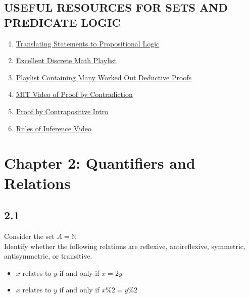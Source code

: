 \documentclass{article}
\begin{document}
\subsection*{USEFUL RESOURCES FOR SETS AND PREDICATE LOGIC}
\begin{enumerate}
    \item \href{https://www.youtube.com/watch?v=A2k3ulOJ3u4}{Translating Statements to Propositional Logic} 
    \item \href{https://www.youtube.com/watch?v=A3Ffwsnad0k&list=PLl-gb0E4MII28GykmtuBXNUNoej-vY5Rz}{Excellent Discrete Math Playlist}
    \item \href{https://www.youtube.com/watch?v=6o1kLNEE-d4&list=PLF_J2w5w0Z3E7jZGz-23P6WrKxokXBkHC}{Playlist Containing Many Worked Out Deductive Proofs}
    \item \href{https://www.youtube.com/watch?v=CpW0ZJ7i0oc}{MIT Video of Proof by Contradiction}
    \item \href{https://www.youtube.com/watch?v=0YqZIHFmVzg}{Proof by Contrapositive Intro}
    \item \href{https://www.youtube.com/watch?v=8DW0K3mnc-0}{Rules of Inference Video}
\end{enumerate}
\newpage
\section*{Chapter 2: Quantifiers and Relations}
\subsection*{2.1}
Consider the set $A=\mathbb{N}$
\\ Identify whether the following relations are reflexive, antireflexive, symmetric, antisymmetric, or transitive.
\begin{itemize}
    \item $x$ relates to $y$ if and only if $x=2y$ 
    \item $x$ relates to $y$ if and only if $x\%2=y\%2$
\end{itemize}
\newpage
\end{document}
